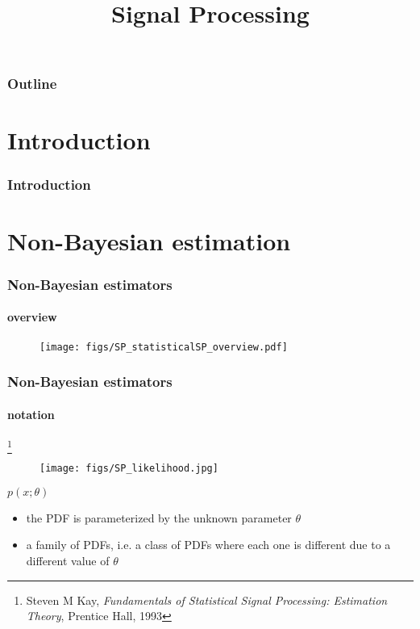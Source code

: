 
\title{Signal Processing}
\begin{frame}[plain]\logoTechTower
	\titlepage
\end{frame}

\begin{frame}
\frametitle{Outline}
\logoCSIPCPL\logoTechTower
	\setcounter{tocdepth}{1}	
	\tableofcontents
\end{frame}


\section{Introduction}
\begin{frame}
\frametitle{Introduction}
\logoEvolution\mypagenum
\end{frame}

\section{Non-Bayesian estimation}
\begin{frame}
\frametitle{Non-Bayesian estimators}
\framesubtitle{overview}
\logoEvolution\mypagenum
	\begin{figure}				
		\texttt{[image: figs/SP\_statisticalSP\_overview.pdf]}
	\end{figure}	
\end{frame}



\begin{frame}
\frametitle{Non-Bayesian estimators}
\framesubtitle{notation}
\footnote {\small Steven M Kay, \emph{Fundamentals of Statistical Signal Processing: Estimation Theory}, Prentice Hall, 1993}
\logoEvolution\mypagenum
	\begin{figure}				
		\texttt{[image: figs/SP\_likelihood.jpg]}
	\end{figure}	
	$p(x;\theta)$
	\begin{itemize}
		\item the PDF is parameterized by the unknown parameter $\theta$
		\item a family of PDFs, i.e. a class of PDFs where each one is different due to a different value of $\theta$
	\end{itemize}			
\end{frame}




